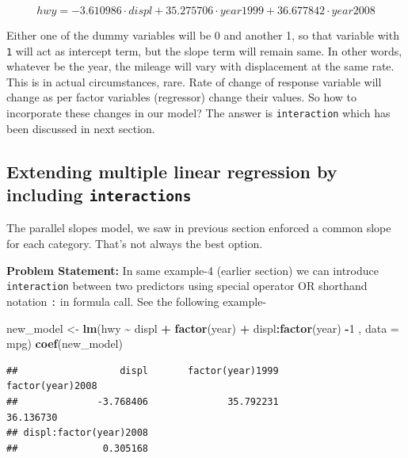 \documentclass[
]{book}
\newenvironment{Shaded}{\begin{snugshade}}{\end{snugshade}}
\newcommand{\AttributeTok}[1]{\textcolor[rgb]{0.13,0.29,0.53}{#1}}
\newcommand{\DecValTok}[1]{\textcolor[rgb]{0.00,0.00,0.81}{#1}}
\newcommand{\FunctionTok}[1]{\textcolor[rgb]{0.13,0.29,0.53}{\textbf{#1}}}
\newcommand{\NormalTok}[1]{#1}
\newcommand{\OtherTok}[1]{\textcolor[rgb]{0.56,0.35,0.01}{#1}}
\newcommand{\SpecialCharTok}[1]{\textcolor[rgb]{0.81,0.36,0.00}{\textbf{#1}}}
\begin{document}
\begin{equation} 
{hwy} = -3.610986\cdot{displ} + 35.275706\cdot{year1999} + 36.677842\cdot{year2008}
\label{eq:lr16}
\end{equation}

Either one of the dummy variables will be 0 and another 1, so that variable with \texttt{1} will act as intercept term, but the slope term will remain same. In other words, whatever be the year, the mileage will vary with displacement at the same rate. This is in actual circumstances, rare. Rate of change of response variable will change as per factor variables (regressor) change their values. So how to incorporate these changes in our model? The answer is \texttt{interaction} which has been discussed in next section.

\hypertarget{extending-multiple-linear-regression-by-including-interactions}{%
\subsection{\texorpdfstring{Extending multiple linear regression by including \texttt{interactions}}{Extending multiple linear regression by including interactions}}\label{extending-multiple-linear-regression-by-including-interactions}}

The parallel slopes model, we saw in previous section enforced a common slope for each category. That's not always the best option.

\textbf{Problem Statement:} In same example-4 (earlier section) we can introduce \texttt{interaction} between two predictors using special operator OR shorthand notation \texttt{:} in formula call. See the following example-

\begin{Shaded}
\begin{Highlighting}[]
\NormalTok{new\_model }\OtherTok{\textless{}{-}} \FunctionTok{lm}\NormalTok{(hwy }\SpecialCharTok{\textasciitilde{}}\NormalTok{ displ }\SpecialCharTok{+} \FunctionTok{factor}\NormalTok{(year) }\SpecialCharTok{+}\NormalTok{ displ}\SpecialCharTok{:}\FunctionTok{factor}\NormalTok{(year) }\SpecialCharTok{{-}}\DecValTok{1}\NormalTok{ , }\AttributeTok{data =}\NormalTok{ mpg)}
\FunctionTok{coef}\NormalTok{(new\_model)}
\end{Highlighting}
\end{Shaded}

\begin{verbatim}
##                  displ       factor(year)1999       factor(year)2008 
##              -3.768406              35.792231              36.136730 
## displ:factor(year)2008 
##               0.305168
\end{verbatim}
\end{document}
